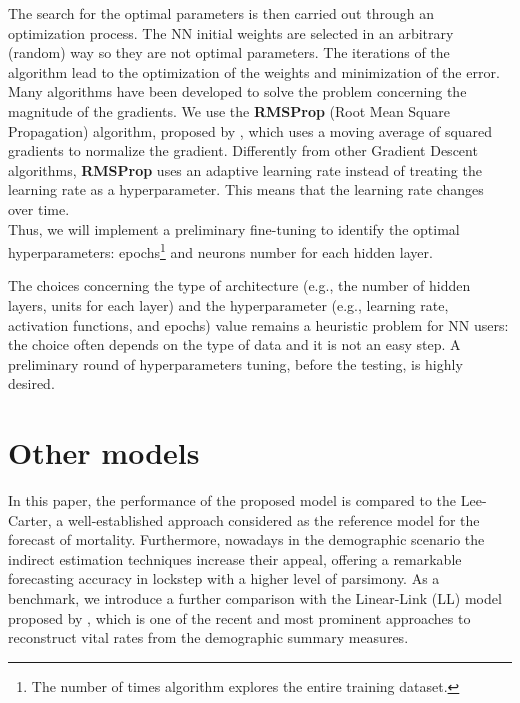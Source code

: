 \documentclass[a4,11pt]{article}
\begin{document}
The search for the optimal parameters is then carried out through an optimization process. The NN initial weights are selected in an arbitrary (random) way so they are not optimal parameters. The iterations of the algorithm lead to the optimization of the weights and minimization of the error. 
Many algorithms have been developed to solve the problem concerning the magnitude of the gradients. We use the \textbf{RMSProp} (Root Mean Square Propagation) algorithm, proposed by \cite{hinton2012neural}, which uses a moving average of squared gradients to normalize the gradient. 
Differently from other Gradient Descent algorithms, \textbf{RMSProp} uses an adaptive learning rate instead of treating the learning rate as a hyperparameter. This means that the learning rate changes over time.\\
Thus, we will implement a preliminary fine-tuning to identify the optimal hyperparameters: epochs\footnote{The number of times algorithm explores the entire training dataset.} and neurons number for each hidden layer.

The choices concerning the type of architecture (e.g., the number of hidden layers, units for each layer) and the hyperparameter (e.g., learning rate, activation functions, and epochs) value remains a heuristic problem for NN users: the choice often depends on the type of data and it is not an easy step. A preliminary round of hyperparameters tuning, before the testing, is highly desired.

\section{Other models}
In this paper, the performance of the proposed model is compared to the Lee-Carter, a well-established approach considered as the reference model for the forecast of mortality. 
Furthermore, nowadays in the demographic scenario the indirect estimation techniques increase their appeal, offering a remarkable forecasting accuracy in lockstep with a higher level of parsimony.
As a benchmark, we introduce a further comparison with the Linear-Link (LL) model proposed by \cite{PascariuLL}, which is one of the recent and most prominent approaches to reconstruct vital rates from the demographic summary measures. 
\end{document}
